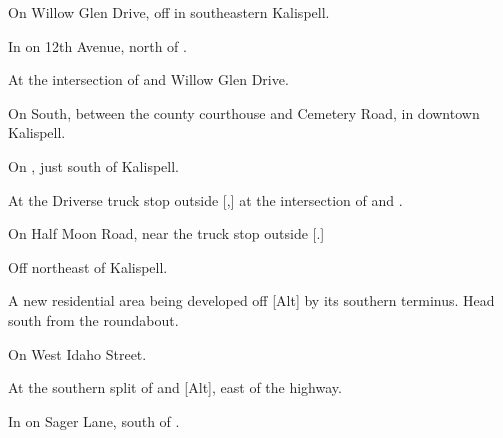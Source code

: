 

\begin{LocationList}

On Willow Glen Drive, off  in southeastern Kalispell.

In  on 12th Avenue, north of .

At the intersection of  and Willow Glen Drive.

On  South, between the county courthouse and Cemetery Road, in downtown Kalispell.

On , just south of Kalispell.

At the Driverse truck stop outside [,] at the intersection of  and .

\Location{\GarageHQ \Garage}
On Half Moon Road, near the truck stop outside [.]

Off 
northeast of Kalispell.

A new residential area being developed off [Alt] by its southern terminus. Head south from the roundabout.

\Location{\RecruitmentAgency \Recruitment}
On  West Idaho Street.

At the southern split of  and [Alt], east of the highway.

In  on Sager Lane, south of .

\end{LocationList}


